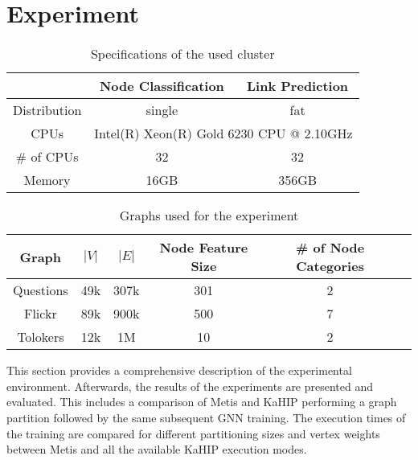 \documentclass[acmsmall,nonacm,screen,review]{acmart}
\begin{document}
\section{Experiment}
\begin{table}[bt!]
\centering
\begin{tabular}{ ccc }
 \centering
  & Node Classification & Link Prediction \\ 
 \hline
 Distribution & single & fat \\
 CPUs & \multicolumn{2}{c}{Intel(R) Xeon(R) Gold 6230 CPU @ 2.10GHz} \\ 
 \# of CPUs & 32 & 32 \\ 
 Memory & 16GB & 356GB \\
\end{tabular}
\caption{Specifications of the used cluster}
\label{hw}
\end{table}
\begin{table}[bt!]
\centering
\begin{tabular}{ cccccc }
 \centering
 Graph & $|V|$ & $|E|$ & Node Feature Size & \# of Node Categories \\ 
 \hline
 Questions \cite{TQ} & 49k & 307k & 301 & 2 \\ 
 Flickr \cite{Flickr} & 89k & 900k & 500 & 7\\ 
 Tolokers \cite{TQ,Tolokers} & 12k & 1M & 10 & 2 \\

\end{tabular}
\caption{Graphs used for the experiment}
\label{graphs}
\end{table}
This section provides a comprehensive description of the experimental environment. Afterwards, the results of the experiments are presented and evaluated. This includes a comparison of Metis and KaHIP performing a graph partition followed by the same subsequent GNN training. The execution times of the training are compared for different partitioning sizes and vertex weights between Metis and all the available KaHIP execution modes. 
\end{document}
